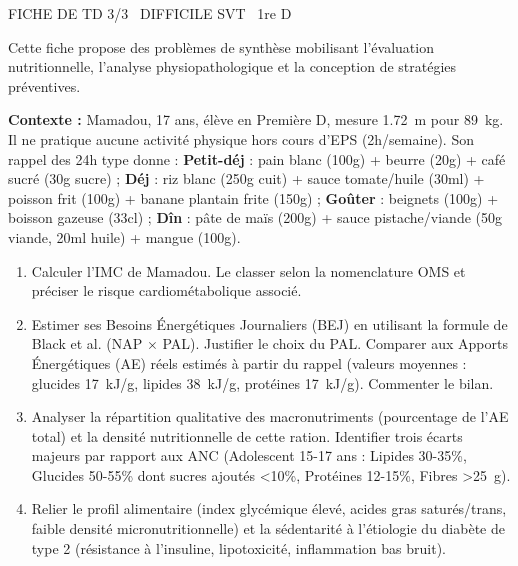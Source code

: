 \documentclass[11pt]{article}
\begin{document}
\begin{tcolorbox}[enhanced,colback=popink,colframe=popink,arc=10pt,boxrule=0pt,left=12pt,right=12pt,top=9pt,bottom=9pt]
{\color{white}\popxbold\small FICHE DE TD 3/3 \textbullet\ DIFFICILE \hfill SVT \textbullet\ 1re D\par}
\end{tcolorbox}
\vspace{4pt}
Cette fiche propose des problèmes de synthèse mobilisant l'évaluation nutritionnelle, l'analyse physiopathologique et la conception de stratégies préventives.

\begin{exercice}
\textbf{Contexte :} Mamadou, 17 ans, élève en Première D, mesure \SI{1,72}{m} pour \SI{89}{kg}. Il ne pratique aucune activité physique hors cours d'EPS (2h/semaine). Son rappel des 24h type donne : \textbf{Petit-déj} : pain blanc (100g) + beurre (20g) + café sucré (30g sucre) ; \textbf{Déj} : riz blanc (250g cuit) + sauce tomate/huile (30ml) + poisson frit (100g) + banane plantain frite (150g) ; \textbf{Goûter} : beignets (100g) + boisson gazeuse (33cl) ; \textbf{Dîn} : pâte de maïs (200g) + sauce pistache/viande (50g viande, 20ml huile) + mangue (100g).
\begin{enumerate}
    \item Calculer l'IMC de Mamadou. Le classer selon la nomenclature OMS et préciser le risque cardiométabolique associé.
    \item Estimer ses Besoins Énergétiques Journaliers (BEJ) en utilisant la formule de Black et al. (NAP $\times$ PAL). Justifier le choix du PAL. Comparer aux Apports Énergétiques (AE) réels estimés à partir du rappel (valeurs moyennes : glucides \SI{17}{kJ/g}, lipides \SI{38}{kJ/g}, protéines \SI{17}{kJ/g}). Commenter le bilan.
    \item Analyser la répartition qualitative des macronutriments (pourcentage de l'AE total) et la densité nutritionnelle de cette ration. Identifier trois écarts majeurs par rapport aux ANC (Adolescent 15-17 ans : Lipides 30-35\%, Glucides 50-55\% dont sucres ajoutés <10\%, Protéines 12-15\%, Fibres >\SI{25}{g}).
    \item Relier le profil alimentaire (index glycémique élevé, acides gras saturés/trans, faible densité micronutritionnelle) et la sédentarité à l'étiologie du diabète de type 2 (résistance à l'insuline, lipotoxicité, inflammation bas bruit).
\end{enumerate}
\end{exercice}
\end{document}
